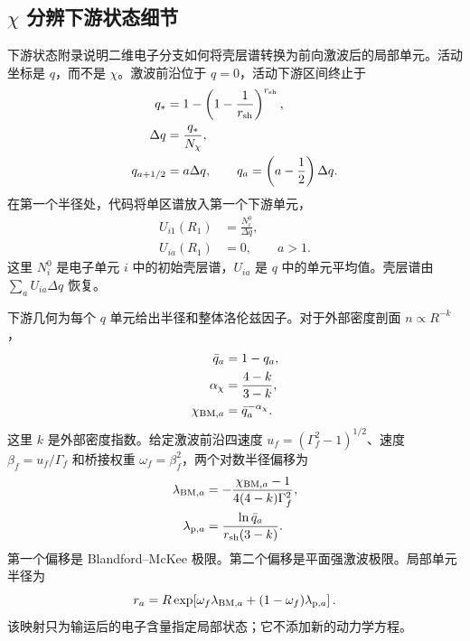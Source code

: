 \documentclass[twocolumn]{aastex702}
\begin{document}
\subsection{\texorpdfstring{\(\chi\)}{chi} 分辨下游状态细节}

下游状态附录说明二维电子分支如何将壳层谱转换为前向激波后的局部单元。活动坐标是 \(q\)，而不是 \(\chi\)。激波前沿位于 \(q=0\)，活动下游区间终止于
\begin{equation}
\begin{aligned}
q_\ast&=1-\left(1-\frac{1}{r_{\rm sh}}\right)^{r_{\rm sh}},\\
\Delta q&=\frac{q_\ast}{N_\chi},\\
q_{a+1/2}&=a\Delta q,\qquad
q_a=\left(a-\frac{1}{2}\right)\Delta q .
\end{aligned}
\end{equation}
在第一个半径处，代码将单区谱放入第一个下游单元，
\begin{equation}
\begin{aligned}
U_{i1}(R_1)&=\frac{N_i^0}{\Delta q},\\
U_{ia}(R_1)&=0,\qquad a>1 .
\end{aligned}
\end{equation}
这里 \(N_i^0\) 是电子单元 \(i\) 中的初始壳层谱，\(U_{ia}\) 是 \(q\) 中的单元平均值。壳层谱由 \(\sum_a U_{ia}\Delta q\) 恢复。

下游几何为每个 \(q\) 单元给出半径和整体洛伦兹因子。对于外部密度剖面 \(n\propto R^{-k}\)，
\begin{equation}
\begin{aligned}
\bar q_a&=1-q_a,\\
\alpha_\chi&=\frac{4-k}{3-k},\\
\chi_{{\rm BM},a}&=\bar q_a^{-\alpha_\chi}.
\end{aligned}
\end{equation}
这里 \(k\) 是外部密度指数。给定激波前沿四速度 \(u_f=(\Gamma_f^2-1)^{1/2}\)、速度 \(\beta_f=u_f/\Gamma_f\) 和桥接权重 \(\omega_f=\beta_f^2\)，两个对数半径偏移为
\begin{equation}
\begin{aligned}
\lambda_{{\rm BM},a}&=-\frac{\chi_{{\rm BM},a}-1}
{4(4-k)\Gamma_f^2},\\
\lambda_{{\rm p},a}&=\frac{\ln \bar q_a}{r_{\rm sh}(3-k)} .
\end{aligned}
\end{equation}
第一个偏移是 Blandford--McKee 极限。第二个偏移是平面强激波极限。局部单元半径为
\begin{equation}
r_a=R\exp\!\left[\omega_f\lambda_{{\rm BM},a}
+(1-\omega_f)\lambda_{{\rm p},a}\right].
\end{equation}
该映射只为输运后的电子含量指定局部状态；它不添加新的动力学方程。
\end{document}

